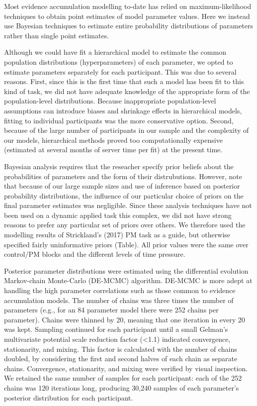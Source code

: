 \documentclass[11pt,]{article}
\begin{document}
Most evidence accumulation modelling to-date has relied on
maximum-likelihood techniques to obtain point estimates of model
parameter values. Here we instead use Bayesian techniques to estimate
entire probability distributions of parameters rather than single point
estimates.

Although we could have fit a hierarchical model to estimate the common
population distributions (hyperparameters) of each parameter, we opted
to estimate parameters separately for each participant. This was due to
several reasons. First, since this is the first time that such a model
has been fit to this kind of task, we did not have adequate knowledge of
the appropriate form of the population-level distributions. Because
inappropriate population-level assumptions can introduce biases and
shrinkage effects in hierarchical models, fitting to individual
participants was the more conservative option. Second, because of the
large number of participants in our sample and the complexity of our
models, hierarchical methods proved too computationally expensive
(estimated at several months of server time per fit) at the present
time.

Bayesian analysis requires that the reseacher specify prior beliefs
about the probabilities of parameters and the form of their
distrubutions. However, note that because of our large sample sizes and
use of inference based on posterior probability distributions, the
influence of our particular choice of priors on the final parameter
estimates was negligible. Since these analysis techniques have not been
used on a dynamic applied task this complex, we did not have strong
reasons to prefer any particular set of priors over others. We therefore
used the modelling results of Strickland's (2017) PM task as a guide,
but otherwise specified fairly uninformative priors (Table). All prior
values were the same over control/PM blocks and the different levels of
time pressure.

Posterior parameter distributions were estimated using the differential
evolution Markov-chain Monte-Carlo (DE-MCMC) algorithm. DE-MCMC is more
adept at handling the high parameter correlations such as those common
to evidence accumulation models. The number of chains was three times
the number of parameters (e.g., for an 84 parameter model there were 252
chains per parameter). Chains were thinned by 20, meaning that one
iteration in every 20 was kept. Sampling continued for each participant
until a small Gelman's multivariate potential scale reduction factor
(\textless{}1.1) indicated convergence, stationarity, and mixing. This
factor is calculated with the number of chains doubled, by considering
the first and second halves of each chain as separate chains.
Convergence, stationarity, and mixing were verified by visual
inspection. We retained the same number of samples for each participant:
each of the 252 chains was 120 iterations long, producing 30,240 samples
of each parameter's posterior distribution for each participant.
\end{document}

